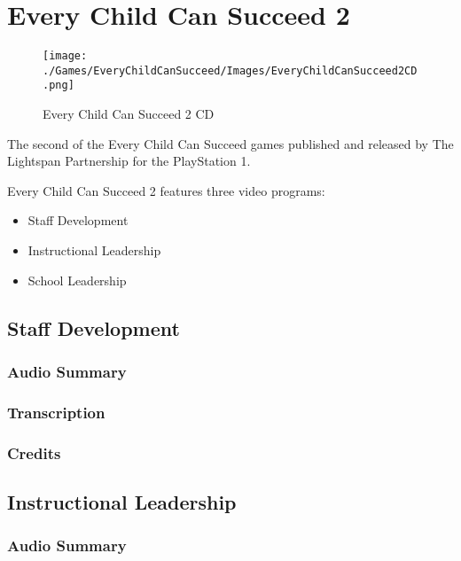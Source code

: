\chapter{Every Child Can Succeed 2}

\begin{figure}[H]
    \centering
    \texttt{[image: ./Games/EveryChildCanSucceed/Images/EveryChildCanSucceed2CD.png]}
    \caption{Every Child Can Succeed 2 CD}
\end{figure}

The second of the Every Child Can Succeed games published and released by The Lightspan Partnership for the PlayStation 1.

Every Child Can Succeed 2 features three video programs:

\begin{itemize}
    \item Staff Development
    \item Instructional Leadership
    \item School Leadership
\end{itemize}

\clearpage
\newpage

\section{Staff Development}

\subsection{Audio Summary}

\subsection{Transcription}

\subsection{Credits}

\section{Instructional Leadership}

\subsection{Audio Summary}

